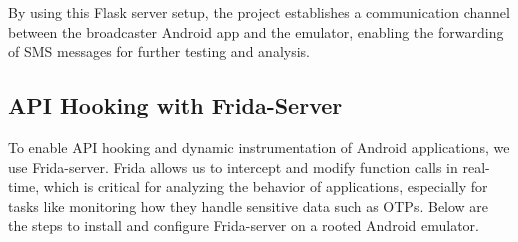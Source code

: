 \documentclass[a4paper,12pt]{article}
\begin{document}
By using this Flask server setup, the project establishes a communication channel between the broadcaster Android app and the emulator, enabling the forwarding of SMS messages for further testing and analysis.

\subsection{API Hooking with Frida-Server}
To enable API hooking and dynamic instrumentation of Android applications, we use Frida-server. Frida allows us to intercept and modify function calls in real-time, which is critical for analyzing the behavior of applications, especially for tasks like monitoring how they handle sensitive data such as OTPs. Below are the steps to install and configure Frida-server on a rooted Android emulator.
\end{document}
